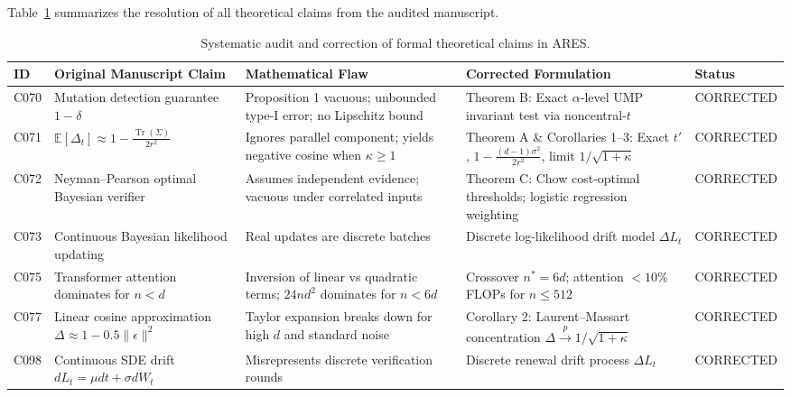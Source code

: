 \documentclass[11pt,a4paper]{article}
\theoremstyle{definition}
\begin{document}
Table~\ref{tab:theory_claims} summarizes the resolution of all theoretical claims from the audited manuscript.

\begin{table}[h!]
\centering
\small
\begin{tabular}{lp{3.2cm}p{4.2cm}p{3.5cm}l}
\toprule
\textbf{ID} & \textbf{Original Manuscript Claim} & \textbf{Mathematical Flaw} & \textbf{Corrected Formulation} & \textbf{Status} \\
\midrule
C070 & Mutation detection guarantee $1 - \delta$ & Proposition 1 vacuous; unbounded type-I error; no Lipschitz bound & Theorem B: Exact $\alpha$-level UMP invariant test via noncentral-$t$ & CORRECTED \\
C071 & $\mathbb{E}[\Delta_t] \approx 1 - \frac{\operatorname{Tr}(\Sigma)}{2r^2}$ & Ignores parallel component; yields negative cosine when $\kappa \ge 1$ & Theorem A \& Corollaries 1--3: Exact $t'$, $1 - \frac{(d-1)\sigma^2}{2r^2}$, limit $1/\sqrt{1+\kappa}$ & CORRECTED \\
C072 & Neyman--Pearson optimal Bayesian verifier & Assumes independent evidence; vacuous under correlated inputs & Theorem C: Chow cost-optimal thresholds; logistic regression weighting & CORRECTED \\
C073 & Continuous Bayesian likelihood updating & Real updates are discrete batches & Discrete log-likelihood drift model $\Delta L_t$ & CORRECTED \\
C075 & Transformer attention dominates for $n < d$ & Inversion of linear vs quadratic terms; $24nd^2$ dominates for $n < 6d$ & Crossover $n^* = 6d$; attention $<10\%$ FLOPs for $n \le 512$ & CORRECTED \\
C077 & Linear cosine approximation $\Delta \approx 1 - 0.5\|\epsilon\|^2$ & Taylor expansion breaks down for high $d$ and standard noise & Corollary 2: Laurent--Massart concentration $\Delta \xrightarrow{p} 1/\sqrt{1+\kappa}$ & CORRECTED \\
C098 & Continuous SDE drift $dL_t = \mu dt + \sigma dW_t$ & Misrepresents discrete verification rounds & Discrete renewal drift process $\Delta L_t$ & CORRECTED \\
\bottomrule
\end{tabular}
\caption{Systematic audit and correction of formal theoretical claims in ARES.}
\label{tab:theory_claims}
\end{table}

\newpage

\newpage

\newpage

\newpage

\newpage

\newpage

\newpage

\newpage

\end{document}
